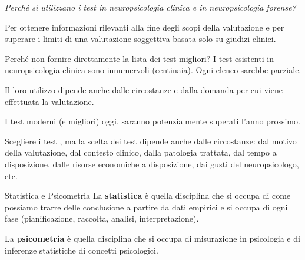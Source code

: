 \documentclass[
  ignorenonframetext,
]{beamer}
\begin{document}
\begin{frame}{}
\label{section}
\emph{Perché si utilizzano i test in neuropsicologia clinica e in
neuropsicologia forense?}

\pause

Per ottenere informazioni rilevanti alla fine degli scopi della
valutazione e per superare i limiti di una valutazione soggettiva basata
solo su giudizi clinici.
\end{frame}

\begin{frame}{Perché non fornire direttamente la lista dei test
migliori?}
\label{perchuxe9-non-fornire-direttamente-la-lista-dei-test-migliori}
I test esistenti in neuropsicologia clinica sono innumervoli
(centinaia). Ogni elenco sarebbe parziale.

Il loro utilizzo dipende anche dalle circostanze e dalla domanda per cui
viene effettuata la valutazione.

I test moderni (e migliori) oggi, saranno potenzialmente superati l'anno
prossimo.
\end{frame}

\begin{frame}{Scegliere i test}
\label{scegliere-i-test}
\setlength{\fboxrule}{1mm}
, ma la scelta dei test dipende anche  dalle circostanze: dal motivo della valutazione, dal contesto clinico, dalla patologia trattata, dal tempo a disposizione, dalle risorse economiche a disposizione, dai gusti del
neuropsicologo, etc.
\end{frame}

\begin{frame}{Statistica e Psicometria}
\label{statistica-e-psicometria}
La \textbf{statistica} è quella disciplina che si occupa di come
possiamo trarre delle conclusione a partire da dati empirici e si occupa
di ogni fase (pianificazione, raccolta, analisi, interpretazione).
\pause

La \textbf{psicometria} è quella disciplina che si occupa di misurazione
in psicologia e di inferenze statistiche di concetti psicologici.
\end{frame}
\end{document}
